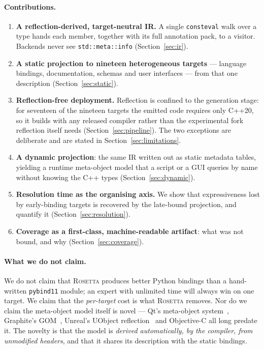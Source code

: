 \documentclass[11pt,a4paper]{article}
\newcommand{\rosetta}{\textsc{Rosetta}}
\newcommand{\code}[1]{\texttt{\small #1}}
\begin{document}
\paragraph{Contributions.}
\begin{enumerate}
  \item \textbf{A reflection-derived, target-neutral IR.} A single
    \code{consteval} walk over a type hands each member, together with its full
    annotation pack, to a visitor. Backends never see \code{std::meta::info}
    (Section~\ref{sec:ir}).
  \item \textbf{A static projection to nineteen heterogeneous targets} ---
    language bindings, documentation, schemas and user interfaces --- from that
    one description (Section~\ref{sec:static}).
  \item \textbf{Reflection-free deployment.} Reflection is confined to the
    generation stage: for seventeen of the nineteen targets the emitted code
    requires only C++20, so it builds with any released compiler rather than
    the experimental fork reflection itself needs
    (Section~\ref{sec:pipeline}). The two exceptions are deliberate and are
    stated in Section~\ref{sec:limitations}.
  \item \textbf{A dynamic projection}: the same IR written out as static
    metadata tables, yielding a runtime meta-object model that a script or a
    GUI queries by name without knowing the C++ types (Section~\ref{sec:dynamic}).
  \item \textbf{Resolution time as the organising axis.} We show that
    expressiveness lost by early-binding targets is recovered by the late-bound
    projection, and quantify it (Section~\ref{sec:resolution}).
  \item \textbf{Coverage as a first-class, machine-readable artifact}: what was
    not bound, and why (Section~\ref{sec:coverage}).
\end{enumerate}

\paragraph{What we do not claim.}
We do not claim that \rosetta{} produces better Python bindings than a
hand-written \code{pybind11} module; an expert with unlimited time will always
win on one target. We claim that the \emph{per-target} cost is what \rosetta{}
removes. Nor do we claim the meta-object model itself is novel --- Qt's
meta-object system~\cite{qt}, Graphite's GOM~\cite{graphite}, Unreal's UObject
reflection~\cite{unreal} and Objective-C all long predate it. The novelty is
that the model is \emph{derived automatically, by the compiler, from unmodified
headers}, and that it shares its description with the static bindings.
\end{document}
